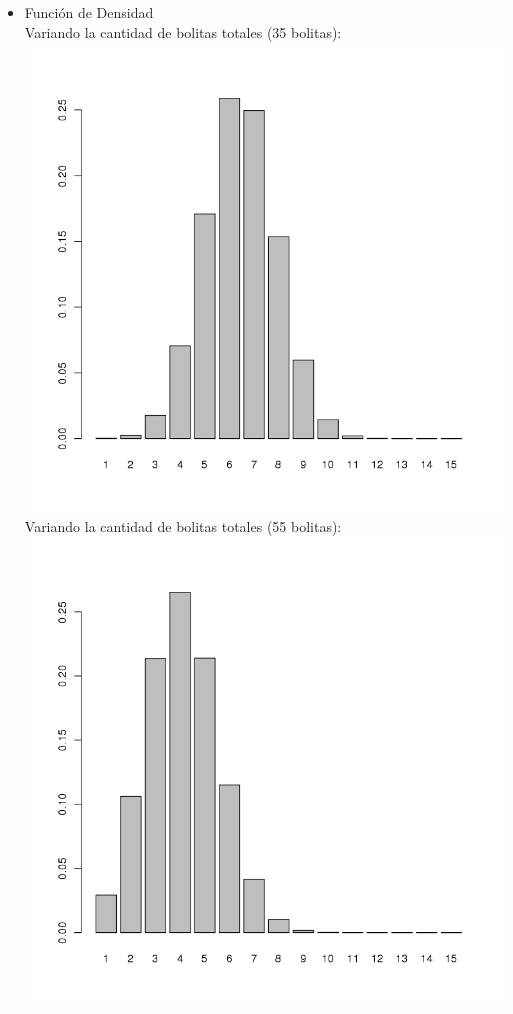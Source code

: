\begin{itemize}
	\begin{itemize}
		\item Funci\'on de Densidad\\
			Variando la cantidad de bolitas totales (35 bolitas):\\
		\includegraphics[scale=0.5]{images/1_5-dhyper-variado1}\\
			Variando la cantidad de bolitas totales (55 bolitas):\\
		\includegraphics[scale=0.5]{images/1_5-dhyper-variado2}\\

\end{itemize}
\end{itemize}
